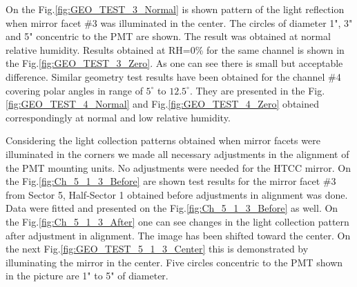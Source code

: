 On the Fig.\ref{fig:GEO_TEST_3_Normal} is shown pattern of the light reflection when mirror facet \#3 was illuminated in the center. The circles of diameter 1", 3" and 5" concentric to the PMT are shown. The result was obtained at normal relative humidity. Results obtained at RH=0\% for the same channel is shown in the Fig.\ref{fig:GEO_TEST_3_Zero}. As one can see there is small but acceptable difference. Similar geometry test results have been obtained for the channel \#4 covering polar angles in range of $5^\circ$ to $12.5^\circ$. They are presented in the Fig.\ref{fig:GEO_TEST_4_Normal} and  Fig.\ref{fig:GEO_TEST_4_Zero} obtained correspondingly at normal and low relative humidity.

\indent Considering the light collection patterns obtained when mirror facets were illuminated in the corners we made all necessary adjustments in the alignment of the PMT mounting units. No adjustments were needed for the HTCC mirror. On the Fig.\ref{fig:Ch_5_1_3_Before} are shown test results for the mirror facet \#3 from Sector 5, Half-Sector 1 obtained before adjustments in alignment was done. Data were fitted and presented on the Fig.\ref{fig:Ch_5_1_3_Before} as well. On the Fig.\ref{fig:Ch_5_1_3_After} one can see changes in the light collection pattern after adjustment in alignment. The image has been shifted toward the center. On the next Fig.\ref{fig:GEO_TEST_5_1_3_Center} this is demonstrated by illuminating the mirror in the center. Five circles concentric to the PMT shown in the picture are 1" to 5" of diameter. 

